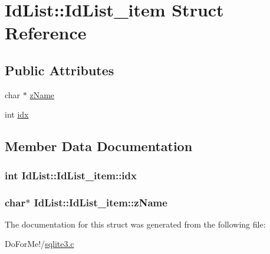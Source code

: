 \hypertarget{struct_id_list_1_1_id_list__item}{\section{Id\-List\-:\-:Id\-List\-\_\-item Struct Reference}
\label{struct_id_list_1_1_id_list__item}
}
\subsection*{Public Attributes}
\begin{DoxyCompactItemize}
\item 
char $\ast$ \hyperlink{struct_id_list_1_1_id_list__item_acd44e1182dc46441939cd6a5d935724c}{z\-Name}
\item 
int \hyperlink{struct_id_list_1_1_id_list__item_a869d1a5ee03bcb018e38fae6c9ac0572}{idx}
\end{DoxyCompactItemize}


\subsection{Member Data Documentation}
\hypertarget{struct_id_list_1_1_id_list__item_a869d1a5ee03bcb018e38fae6c9ac0572}{
\subsubsection[{idx}]{\setlength{\rightskip}{0pt plus 5cm}int Id\-List\-::\-Id\-List\-\_\-item\-::idx}}\label{struct_id_list_1_1_id_list__item_a869d1a5ee03bcb018e38fae6c9ac0572}
\hypertarget{struct_id_list_1_1_id_list__item_acd44e1182dc46441939cd6a5d935724c}{
\subsubsection[{z\-Name}]{\setlength{\rightskip}{0pt plus 5cm}char$\ast$ Id\-List\-::\-Id\-List\-\_\-item\-::z\-Name}}\label{struct_id_list_1_1_id_list__item_acd44e1182dc46441939cd6a5d935724c}


The documentation for this struct was generated from the following file\-:\begin{DoxyCompactItemize}
\item 
Do\-For\-Me!/\hyperlink{sqlite3_8c}{sqlite3.\-c}\end{DoxyCompactItemize}
